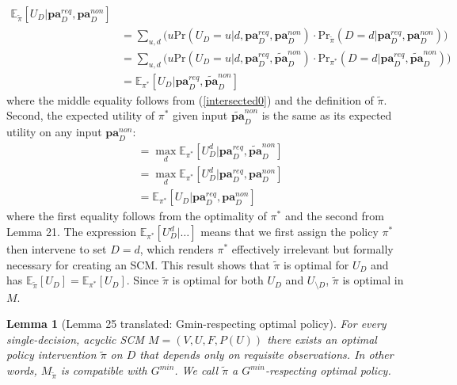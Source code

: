 \documentclass[letterpaper,10pt]{article}
\newtheorem{lemma}[theorem]{Lemma}
\begin{document}
\begin{align*}
\mathbb{E}_{\tilde{\pi}} [U_{D}|\mathbf{pa}_D^{req},\mathbf{pa}^{non}_D] \\
&= \sum_{u,d}\big(u\text{Pr}(U_D=u|d,\mathbf{pa}_D^{req},\mathbf{pa}^{non}_D) 
\cdot \text{Pr}_{\tilde{\pi}} (D=d|\mathbf{pa}_D^{req},\mathbf{pa}^{non}_D) \big)\\
&= \sum_{u,d}\big(u\text{Pr}(U_D=u|d,\mathbf{pa}_D^{req},\mathbf{\tilde{pa}}^{non}_D) 
\cdot \text{Pr}_{\pi^*} (D=d|\mathbf{pa}_D^{req},\mathbf{\tilde{pa}}^{non}_D) \big)\\
&= \mathbb{E}_{\pi^*} [U_{D}|\mathbf{pa}_D^{req},\mathbf{\tilde{pa}}^{non}_D]
\end{align*}
where the middle equality follows from (\ref{intersected0}) and the definition of $\tilde{\pi}$. 
Second, the expected utility of $\pi^*$ given input $\mathbf{\tilde{pa}}^{non}_D$ is the same as its expected utility on any input $\mathbf{pa}^{non}_D$:
\begin{align*}
&= \max_{d} \mathbb{E}_{\pi^*} [U_{D}^d|\mathbf{pa}_D^{req},\mathbf{\tilde{pa}}^{non}_D] \\
&= \max_{d} \mathbb{E}_{\pi^*} [U_{D}^d|\mathbf{pa}_D^{req},\mathbf{pa}^{non}_D] \\
&= \mathbb{E}_{\pi^*} [U_{D}|\mathbf{pa}_D^{req},\mathbf{pa}^{non}_D]
\end{align*}
where the first equality follows from the optimality of $\pi^*$ and the second from Lemma 21. 
The expression $\mathbb{E}_{\pi^*} [U_{D}^d|\hdots]$ means that we first assign the policy $\pi^*$ then intervene to set $D=d$, which renders $\pi^*$ effectively irrelevant but formally necessary for creating an SCM.
This result shows that $\tilde{\pi}$ is optimal for $U_D$ and has $\mathbb{E}_{\tilde{\pi}} [U_{D}]=\mathbb{E}_{\pi^*} [U_{D}]$.
Since $\tilde{\pi}$ is optimal for both $U_D$ and $U_{\setminus D}$, $\tilde{\pi}$ is optimal in $M$.









\newpage
\begin{lemma}[Lemma 25 translated: Gmin-respecting optimal policy]\label{lemma25:translated}
For every single-decision, acyclic SCM $M=(V,U,F,P(U))$ there exists an optimal policy intervention $\tilde{\pi}$ on $D$ that depends only on requisite observations. In other words, $M_{\tilde{\pi}}$ is compatible with $G^{min}$. We call $\tilde{\pi}$ a $G^{min}$-respecting optimal policy.
\end{lemma}
\end{document}
